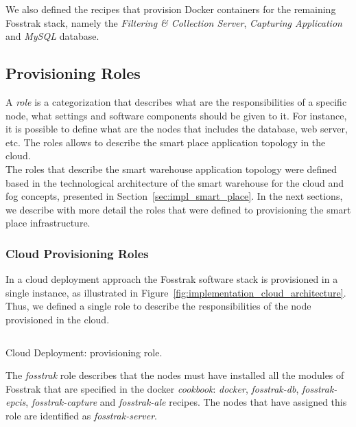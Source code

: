 We also defined the recipes that provision Docker containers for the remaining Fosstrak
stack, namely the \textit{Filtering \& Collection Server}, \textit{Capturing Application} and
\textit{MySQL} database.

\subsection{Provisioning Roles}
\label{sub:provisioning_roles}
A \textit{role} is a categorization that describes what are the responsibilities of a specific
node, what settings and software components should be given to it. For instance, it is possible
to define what are the nodes that includes the database, web server, etc. The roles allows to describe
the smart place application topology in the cloud.\\

The roles that describe the smart warehouse application topology were defined based in the
technological architecture of the smart warehouse for the cloud and fog concepts, presented in Section~\ref{sec:impl_smart_place}.
In the next sections, we describe with more detail the roles that were defined to provisioning the
smart place infrastructure.

\subsubsection{Cloud Provisioning Roles}
\label{sub:cloud_roles}
In a cloud deployment approach the Fosstrak software stack is provisioned in a single instance, as
illustrated in Figure~\ref{fig:implementation_cloud_architecture}. Thus, we defined a single role
to describe the responsibilities of the node provisioned in the cloud.\\

\begin{listing}[ht!]
  \inputminted[frame=lines,
                 framesep=3mm,
                 linenos=true,
                 xleftmargin=21pt,
                 tabsize=4]{json}{./listings/fosstrak_role.json}
  \caption{Cloud Deployment: provisioning role.}
  \label{listing:cloud_recipe}
\end{listing}

The \textit{fosstrak} role describes that the nodes must have installed all the modules of Fosstrak
that are specified in the docker \textit{cookbook}: \textit{docker}, \textit{fosstrak-db},
\textit{fosstrak-epcis}, \textit{fosstrak-capture} and \textit{fosstrak-ale} recipes. The nodes
that have assigned this role are identified as \textit{fosstrak-server}.

